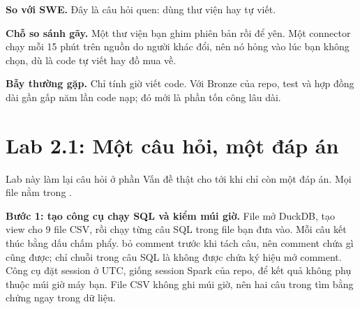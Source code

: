 \begin{ghichu}
\textbf{So với SWE.} Đây là câu hỏi quen: dùng thư viện hay tự viết.

\textbf{Chỗ so sánh gãy.} Một thư viện bạn ghim phiên bản rồi để yên. Một connector chạy mỗi 15 phút trên nguồn do người khác đổi, nên nó hỏng vào lúc bạn không chọn, dù là code tự viết hay đồ mua về.
\end{ghichu}

\begin{luuy}
\textbf{Bẫy thường gặp.} Chỉ tính giờ viết code. Với Bronze của repo, test và hợp đồng dài gần gấp năm lần code nạp; đó mới là phần tốn công lâu dài.
\end{luuy}

\section{Lab 2.1: Một câu hỏi, một đáp án}

Lab này làm lại câu hỏi ở phần Vấn đề thật cho tới khi chỉ còn một đáp án. Mọi file nằm trong .

\textbf{Bước 1: tạo công cụ chạy SQL và kiểm múi giờ.} File  mở DuckDB, tạo view cho 9 file CSV, rồi chạy từng câu SQL trong file bạn đưa vào. Mỗi câu kết thúc bằng dấu chấm phẩy.  bỏ comment trước khi tách câu, nên comment chứa gì cũng được; chỉ chuỗi trong câu SQL là không được chứa ký hiệu mở comment. Công cụ đặt session ở UTC, giống session Spark của repo, để kết quả không phụ thuộc múi giờ máy bạn. File CSV không ghi múi giờ, nên hai câu trong  tìm bằng chứng ngay trong dữ liệu.


